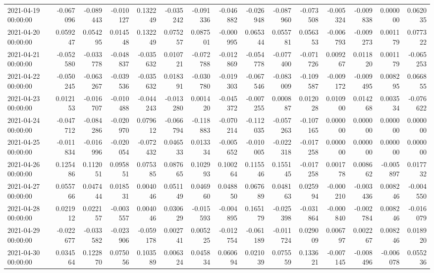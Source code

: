 \begin{tabular}{lrrrrrrrrrrrrrr}
2021-04-19 00:00:00 & -0.067096 & -0.089443 & -0.010127 & 0.132249 & -0.035242 & -0.091336 & -0.046882 & -0.026948 & -0.087960 & -0.073508 & -0.005324 & -0.009838 & 0.000000 & 0.062035 \\
2021-04-20 00:00:00 & 0.059247 & 0.054295 & 0.014548 & 0.132249 & 0.075257 & 0.087501 & -0.000995 & 0.065344 & 0.055781 & 0.056353 & -0.006793 & -0.009273 & 0.001179 & 0.077322 \\
2021-04-21 00:00:00 & -0.052580 & -0.033778 & -0.048837 & -0.035632 & 0.010721 & -0.072788 & -0.012869 & -0.054778 & -0.077400 & -0.071726 & 0.009267 & 0.011820 & 0.001179 & -0.065253 \\
2021-04-22 00:00:00 & -0.050245 & -0.063267 & -0.039536 & -0.035632 & 0.018391 & -0.030780 & -0.019303 & -0.067546 & -0.083009 & -0.109587 & -0.009172 & -0.009495 & 0.008295 & 0.066855 \\
2021-04-23 00:00:00 & 0.012153 & -0.016707 & -0.010488 & -0.044243 & -0.013280 & 0.001420 & -0.045372 & -0.007255 & 0.000887 & 0.012028 & 0.010900 & 0.014268 & 0.003534 & -0.076622 \\
2021-04-24 00:00:00 & -0.047712 & -0.084286 & -0.020970 & 0.079612 & -0.066794 & -0.118883 & -0.070214 & -0.112035 & -0.057263 & -0.107165 & 0.000000 & 0.000000 & 0.000000 & 0.000000 \\
2021-04-25 00:00:00 & -0.011834 & -0.016996 & -0.020054 & -0.072432 & 0.046533 & 0.013334 & -0.005652 & -0.010005 & -0.022318 & -0.017258 & 0.000000 & 0.000000 & 0.000000 & 0.000000 \\
2021-04-26 00:00:00 & 0.125486 & 0.112051 & 0.095851 & 0.075385 & 0.087665 & 0.102993 & 0.100264 & 0.115546 & 0.155145 & -0.017258 & 0.001778 & 0.008662 & -0.005897 & 0.017732 \\
2021-04-27 00:00:00 & 0.055766 & 0.047444 & 0.018531 & 0.004046 & 0.051149 & 0.046960 & 0.048850 & 0.067689 & 0.048163 & 0.025994 & -0.000210 & -0.003436 & 0.008246 & -0.004550 \\
2021-04-28 00:00:00 & 0.021912 & 0.022157 & -0.003557 & 0.004046 & 0.030629 & -0.015593 & -0.004895 & 0.165179 & -0.025398 & -0.031864 & -0.000840 & -0.002784 & 0.008246 & -0.016079 \\
2021-04-29 00:00:00 & -0.022677 & -0.033582 & -0.023906 & -0.059178 & 0.002741 & 0.005225 & -0.012754 & -0.061189 & -0.011724 & 0.029009 & 0.006797 & 0.002267 & 0.008246 & 0.018920 \\
2021-04-30 00:00:00 & 0.034564 & 0.122870 & 0.075056 & 0.103589 & 0.006324 & 0.045834 & 0.060694 & 0.021039 & 0.075559 & 0.133621 & -0.007145 & -0.008496 & -0.006078 & 0.055236 \\

\end{tabular}
